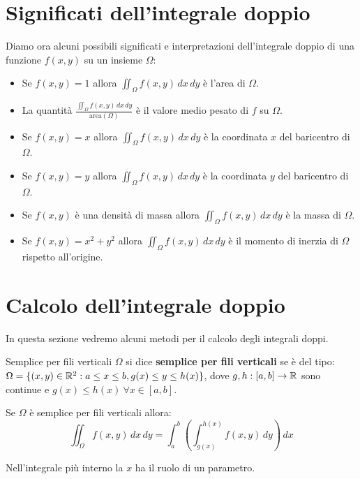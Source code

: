 \section{Significati dell'integrale doppio}
Diamo ora alcuni possibili significati e interpretazioni dell'integrale doppio di una funzione $f(x,y)$ su un insieme $\Omega$:

\begin{itemize}
  \item Se $f(x,y)=1$ allora $\iint_{\Omega} f(x,y) \, dx \, dy$ è l'area di $\Omega$.
  \item La quantità $\frac{\iint_{\Omega} f(x,y) \, dx \, dy}{\text{area}(\Omega)}$ è il valore medio pesato di $f$ su $\Omega$.
  \item Se $f(x,y)=x$ allora $\iint_{\Omega} f(x,y) \, dx \, dy$ è la coordinata $x$ del baricentro di $\Omega$.
  \item Se $f(x,y)=y$ allora $\iint_{\Omega} f(x,y) \, dx \, dy$ è la  coordinata $y$ del baricentro di $\Omega$.
  \item Se $f(x,y)$ è una densità di massa allora $\iint_{\Omega} f(x,y) \, dx \, dy$ è la massa di $\Omega$.
  \item Se $f(x,y)=x^2+y^2$ allora $\iint_{\Omega} f(x,y) \, dx \, dy$ è il momento di inerzia di $\Omega$ rispetto all'origine.
\end{itemize}

\section{Calcolo dell'integrale doppio}
In questa sezione vedremo alcuni metodi per il calcolo degli integrali doppi.\\

\begin{definizione}{Semplice per fili verticali}
  $\Omega$ si dice \textbf{semplice per fili verticali} se è del tipo: $\Omega = \{ (x,y) \in \mathbb{R}^2 : a \leq x \leq b, g(x) \leq y \leq h(x) \}$, dove $g,h:[a,b] \rightarrow \mathbb{R}$ sono continue e $g(x) \leq h(x) \ \forall x \in [a,b]$.
\end{definizione}

Se $\Omega$ è semplice per fili verticali allora:
\[
\iint_{\Omega} f(x,y) \, dx \, dy = \int_{a}^{b} \left( \int_{g(x)}^{h(x)} f(x,y) \, dy \right) \, dx
\]

\begin{osservazione}{}
  Nell'integrale più interno la $x$ ha il ruolo di un parametro.
\end{osservazione}

